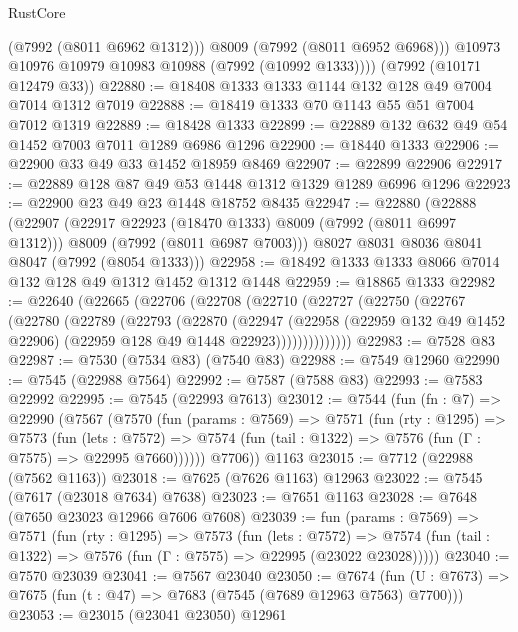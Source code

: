 \begin{lexlean}{RustCore}
\begin{coremodule}
            (@7992 (@8011 @6962 @1312)))
          @8009
          (@7992 (@8011 @6952 @6968)))
        @10973
        @10976
        @10979
        @10983
        @10988
        (@7992 (@10992 @1333))))
    (@7992 (@10171 @12479 @33))
@22880 := @18408 @1333 @1333 @1144 @132 @128 @49 @7004 @7014 @1312 @7019
@22888 := @18419 @1333 @70 @1143 @55 @51 @7004 @7012 @1319
@22889 := @18428 @1333
@22899 := @22889 @132 @632 @49 @54 @1452 @7003 @7011 @1289 @6986 @1296
@22900 := @18440 @1333
@22906 := @22900 @33 @49 @33 @1452 @18959 @8469
@22907 := @22899 @22906
@22917 := @22889 @128 @87 @49 @53 @1448 @1312 @1329 @1289 @6996 @1296
@22923 := @22900 @23 @49 @23 @1448 @18752 @8435
@22947 := @22880
    (@22888
      (@22907
        (@22917 @22923 (@18470 @1333) @8009 (@7992 (@8011 @6997 @1312)))
        @8009
        (@7992 (@8011 @6987 @7003)))
      @8027
      @8031
      @8036
      @8041
      @8047
      (@7992 (@8054 @1333)))
@22958 := @18492 @1333 @1333 @8066 @7014 @132 @128 @49 @1312 @1452 @1312 @1448
@22959 := @18865 @1333
@22982 := @22640
    (@22665
      (@22706
        (@22708
          (@22710
            (@22727
              (@22750
                (@22767
                  (@22780
                    (@22789
                      (@22793
                        (@22870
                          (@22947
                            (@22958
                              (@22959 @132 @49 @1452 @22906)
                              (@22959 @128 @49 @1448 @22923))))))))))))))
@22983 := @7528 @83
@22987 := @7530 (@7534 @83) (@7540 @83)
@22988 := @7549 @12960
@22990 := @7545 (@22988 @7564)
@22992 := @7587 (@7588 @83)
@22993 := @7583 @22992
@22995 := @7545 (@22993 @7613)
@23012 := @7544
    (fun (fn : @7) =>
    @22990
      (@7567
        (@7570
          (fun (params : @7569) =>
          @7571
            (fun (rty : @1295) =>
            @7573
              (fun (lets : @7572) =>
              @7574 (fun (tail : @1322) => @7576 (fun (Γ : @7575) => @22995 @7660))))))
        @7706))
    @1163
@23015 := @7712 (@22988 (@7562 @1163))
@23018 := @7625 (@7626 @1163) @12963
@23022 := @7545 (@7617 (@23018 @7634) @7638)
@23023 := @7651 @1163
@23028 := @7648 (@7650 @23023 @12966 @7606 @7608)
@23039 := fun (params : @7569) =>
  @7571
    (fun (rty : @1295) =>
    @7573
      (fun (lets : @7572) =>
      @7574 (fun (tail : @1322) => @7576 (fun (Γ : @7575) => @22995 (@23022 @23028)))))
@23040 := @7570 @23039
@23041 := @7567 @23040
@23050 := @7674
    (fun (U : @7673) => @7675 (fun (t : @47) => @7683 (@7545 (@7689 @12963 @7563) @7700)))
@23053 := @23015 (@23041 @23050) @12961

\end{coremodule}
\end{lexlean}
